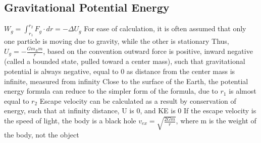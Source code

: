 \documentclass[11 pt, twoside]{article}
\newenvironment{outline*}
{
	\begin{outline}[enumerate]
	}
	{\end{outline}
}
\begin{document}
\subsection{Gravitational Potential Energy}
\begin{outline*}
\1 $W_g = \int^{r_2}_{r_1} F_g \cdot dr = -\Delta U_g$
\2 For ease of calculation, it is often assumed that only one particle is moving due to gravity, while the other is stationary
\2 Thus, $U_g = -\frac{Gm_Em}{r}$, based on the convention outward force is positive, inward negative (called a bounded state, pulled toward a center mass), such that gravitational potential is always negative, equal to 0 as distance from the center mass is infinite, measured from infinity
\2 Close to the surface of the Earth, the potential energy formula can reduce to the simpler form of the formula, due to $r_1$ is almost equal to $r_2$
\1 Escape velocity can be calculated as a result by conservation of energy, such that at infinity distance, U is 0, and KE is 0
\2 If the escape velocity is the speed of light, the body is a black hole
\2 $v_{ex} = \sqrt{\frac{2Gm}{r}}$, where m is the weight of the body, not the object
\end{outline*}
\end{document}

